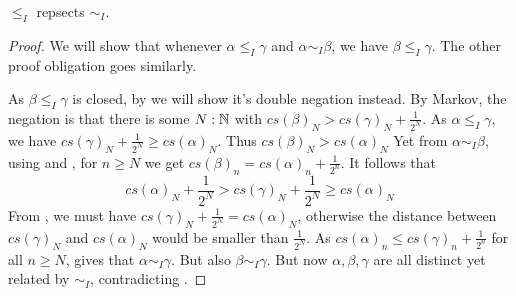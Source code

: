 
\begin{lemma}
  $\leq_I$ repsects $\sim_I$. 
\end{lemma}
\begin{proof}
  We will show that whenever $\alpha\leq_I \gamma$ and $\alpha\sim_I\beta$, we have $\beta\leq_I\gamma$. 
  The other proof obligation goes similarly. 


  As $\beta\leq_I\gamma$ is closed, by  we will show it's double negation instead. 
  By Markov, the negation is that there is some 
  $N:\mathbb{N}$ with 
  $cs(\beta)_N > cs(\gamma)_N + \frac{1}{2^N}.$
  As $\alpha\leq_I\gamma$, we have 
  $cs(\gamma)_N + \frac{1}{2^N}\geq cs(\alpha)_N $. 
  Thus $cs(\beta)_N > cs(\alpha)_N$
  Yet from $\alpha\sim_I\beta$, using  and , 
  for $n\geq N$ we get 
  $cs(\beta)_n = cs(\alpha)_n + \frac{1}{2^n}$.
  It follows that 
  $$
  cs(\alpha)_N+\frac{1}{2^N} > cs(\gamma)_N + \frac{1}{2^N} \geq cs(\alpha)_N
  $$
  From , we must have
  $cs(\gamma)_N  + \frac{1}{2^N} = cs(\alpha)_N$, otherwise the distance 
  between $cs(\gamma)_N$ and $cs(\alpha)_N$ 
  would be smaller than $\frac{1}{2^N}$.
  As $cs(\alpha)_n \leq cs(\gamma)_n + \frac{1}{2^n}$ for all $n\geq N$, 
   gives that 
  $\alpha\sim_I\gamma$. But also $\beta\sim_I\gamma$. 
  But now $\alpha,\beta,\gamma$ are all distinct yet related by $\sim_I$, contradicting 
  . 
\end{proof}
